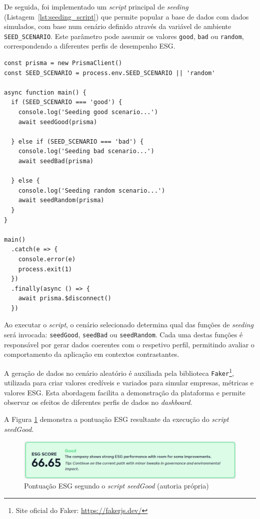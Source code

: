 De seguida, foi implementado um \textit{script} principal de \textit{seeding} (Listagem~\ref{lst:seeding_script}) que permite popular a base de dados com dados simulados, com base num cenário definido através da variável de ambiente \verb|SEED_SCENARIO|. Este parâmetro pode assumir os valores \verb|good|, \verb|bad| ou \verb|random|, correspondendo a diferentes perfis de desempenho ESG.

\begin{lstlisting}[style=customts, caption={\textit{Script} de \textit{seeding} da Base de Dados}, label={lst:seeding_script}]
const prisma = new PrismaClient()
const SEED_SCENARIO = process.env.SEED_SCENARIO || 'random'

async function main() {
  if (SEED_SCENARIO === 'good') {
    console.log('Seeding good scenario...')
    await seedGood(prisma)

  } else if (SEED_SCENARIO === 'bad') {
    console.log('Seeding bad scenario...')
    await seedBad(prisma)

  } else {
    console.log('Seeding random scenario...')
    await seedRandom(prisma)
  }
}

main()
  .catch(e => {
    console.error(e)
    process.exit(1)
  })
  .finally(async () => {
    await prisma.$disconnect()
  })
\end{lstlisting}

Ao executar o \textit{script}, o cenário selecionado determina qual das funções de \textit{seeding} será invocada: \texttt{seedGood}, \texttt{seedBad} ou \texttt{seedRandom}. Cada uma destas funções é responsável por gerar dados coerentes com o respetivo perfil, permitindo avaliar o comportamento da aplicação em contextos contrastantes.

A geração de dados no cenário aleatório é auxiliada pela biblioteca \texttt{Faker}\footnote{Site oficial do Faker: \url{https://fakerjs.dev/}}, utilizada para criar valores credíveis e variados para simular empresas, métricas e valores ESG. Esta abordagem facilita a demonstração da plataforma e permite observar os efeitos de diferentes perfis de dados no \textit{dashboard}.

A Figura \ref{fig:good_esg} demonstra a pontuação ESG resultante da execução do \textit{script seedGood}.

\begin{figure}[H]
    \centering
    \includegraphics[width=\linewidth,keepaspectratio]{frontmatter/assets/platform_prints/seeding/good_esg.png}
    \caption{Pontuação ESG segundo o \textit{script seedGood} (autoria própria)}
    \label{fig:good_esg}
\end{figure}

